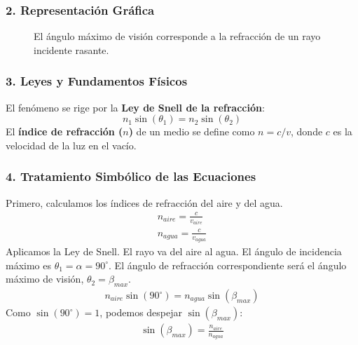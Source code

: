 \subsubsection*{2. Representación Gráfica}
\begin{figure}[H]
    \centering
    \caption{El ángulo máximo de visión corresponde a la refracción de un rayo incidente rasante.}
\end{figure}

\subsubsection*{3. Leyes y Fundamentos Físicos}
El fenómeno se rige por la \textbf{Ley de Snell de la refracción}:
$$n_1 \sin(\theta_1) = n_2 \sin(\theta_2)$$
El \textbf{índice de refracción ($n$)} de un medio se define como $n = c/v$, donde $c$ es la velocidad de la luz en el vacío.

\subsubsection*{4. Tratamiento Simbólico de las Ecuaciones}
Primero, calculamos los índices de refracción del aire y del agua.
\begin{gather}
    n_{aire} = \frac{c}{v_{aire}} \\
    n_{agua} = \frac{c}{v_{agua}}
\end{gather}
Aplicamos la Ley de Snell. El rayo va del aire al agua. El ángulo de incidencia máximo es $\theta_1 = \alpha = 90^\circ$. El ángulo de refracción correspondiente será el ángulo máximo de visión, $\theta_2 = \beta_{max}$.
\begin{gather}
    n_{aire} \sin(90^\circ) = n_{agua} \sin(\beta_{max})
\end{gather}
Como $\sin(90^\circ)=1$, podemos despejar $\sin(\beta_{max})$:
\begin{gather}
    \sin(\beta_{max}) = \frac{n_{aire}}{n_{agua}}
\end{gather}

